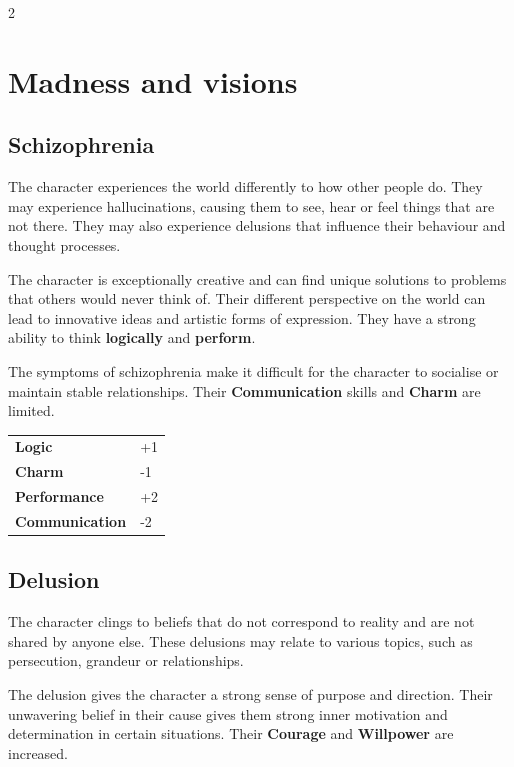 \label{ch:appendix-quirks}

\begin{multicols}{2}

    \section{Madness and visions}

    \subsection*{Schizophrenia}

    The character experiences the world differently to how other people do. They may experience hallucinations, causing them to see, hear or feel things that are not there. They may also experience delusions that influence their behaviour and thought processes.

    The character is exceptionally creative and can find unique solutions to problems that others would never think of. Their different perspective on the world can lead to innovative ideas and artistic forms of expression. They have a strong ability to think \textbf{logically} and \textbf{perform}.

    The symptoms of schizophrenia make it difficult for the character to socialise or maintain stable relationships. Their \textbf{Communication} skills and \textbf{Charm} are limited.

    \begin{tabular}{@{}ll@{}}
        \textbf{Logic} & +1\\
        \textbf{Charm} & -1\\
        \textbf{Performance} & +2\\
        \textbf{Communication} & -2\\
    \end{tabular}

    \subsection*{Delusion}

    The character clings to beliefs that do not correspond to reality and are not shared by anyone else. These delusions may relate to various topics, such as persecution, grandeur or relationships.

    The delusion gives the character a strong sense of purpose and direction. Their unwavering belief in their cause gives them strong inner motivation and determination in certain situations. Their \textbf{Courage} and \textbf{Willpower} are increased.


\end{multicols}
